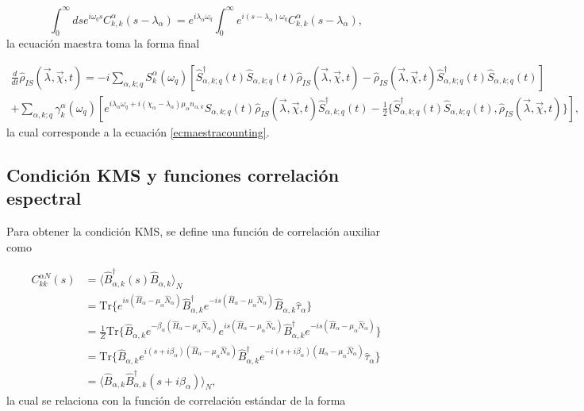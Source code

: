 \begin{appendixs}
\begin{equation*}
    \int_{0}^{\infty}dse^{i\omega_{q}s}C^{\alpha}_{k,k}(s-\lambda_{\alpha}) = e^{i\lambda_{\alpha}\omega_{q}}\int_{0}^{\infty}e^{i(s-\lambda_{\alpha})\omega_{q}}C^{\alpha}_{k,k}(s-\lambda_{\alpha}), 
\end{equation*}
la ecuación maestra toma la forma final

\begin{multline*}
    \frac{d}{dt}\hat{\rho}_{IS}(\vec{\lambda},\vec{\chi},t) = - i \sum_{\alpha,k;q}S^{\alpha}_{k}(\omega_{q})\left[\hat{S}^{\dagger}_{\alpha,k;q}(t)\hat{S}_{\alpha,k;q}(t)\hat{\rho}_{IS}(\vec{\lambda},\vec{\chi},t) - \hat{\rho}_{IS}(\vec{\lambda},\vec{\chi},t)\hat{S}^{\dagger}_{\alpha,k;q}(t)\hat{S}_{\alpha,k;q}(t) \right] \\
    + \sum_{\alpha,k;q} \gamma_{k}^{\alpha}(\omega_{q})\left[ e^{i\lambda_{\alpha}\omega_{q}+ i(\chi_{\alpha} - \lambda_{\alpha})\mu_{\alpha}n_{\alpha,k}}\hat{S}_{\alpha,k;q}(t)\hat{\rho}_{IS}(\vec{\lambda},\vec{\chi},t)\hat{S}^{\dagger}_{\alpha,k;q}(t) - \frac{1}{2}\{\hat{S}^{\dagger}_{\alpha,k;q}(t)\hat{S}_{\alpha,k;q}(t),\hat{\rho}_{IS}(\vec{\lambda},\vec{\chi},t) \} \right],
\end{multline*}
la cual corresponde a la ecuación \eqref{ecmaestracounting}.

\label{apendixGKLSgeneral}





\subsection{Condición KMS y funciones correlación espectral}

Para obtener la condición KMS, se define una función de correlación auxiliar como

\begin{align*}
    C^{\alpha N}_{kk}(s) & =  \langle \hat{B}^{\dagger}_{\alpha,k}(s)\hat{B}_{\alpha,k} \rangle_{N} \\
   &  = \text{Tr}\{e^{is(\hat{H}_{\alpha} - \mu_{\alpha}\hat{N}_{\alpha})}\hat{B}^{\dagger}_{\alpha,k}e^{-is(\hat{H}_{\alpha} - \mu_{\alpha}\hat{N}_{\alpha})}\hat{B}_{\alpha,k}\hat{\tau}_{\alpha}  \} \\
   & = \frac{1}{Z}\text{Tr}\{\hat{B}_{\alpha,k} e^{-\beta_{\alpha}(\hat{H}_{\alpha} - \mu_{\alpha}\hat{N}_{\alpha})} e^{is(\hat{H}_{\alpha} - \mu_{\alpha}\hat{N}_{\alpha})}\hat{B}^{\dagger}_{\alpha,k}e^{-is(\hat{H}_{\alpha} - \mu_{\alpha}\hat{N}_{\alpha})}\} \\
   & = \text{Tr}\{\hat{B}_{\alpha,k}e^{i(s+i\beta_{\alpha})(\hat{H}_{\alpha} - \mu_{\alpha}\hat{N}_{\alpha})}\hat{B}^{\dagger}_{\alpha,k}e^{-i(s+i\beta_{\alpha})(\hat{H}_{\alpha} - \mu_{\alpha}\hat{N}_{\alpha})}\hat{\tau}_{\alpha} \} \\
   & = \langle \hat{B}_{\alpha,k} \hat{B}^{\dagger}_{\alpha,k}(s+i\beta_{\alpha})\rangle_{N},
\end{align*}
la cual se relaciona con la función de correlación estándar de la forma


\end{appendixs}
